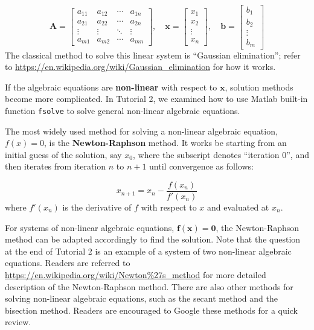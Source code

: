 \documentclass[a4paper,11pt]{article}
\newcommand{\bm}{\mathbf}
\theoremstyle{definition}
\begin{document}
\begin{equation}
	\bm A = \left[ 
		\begin{array}{cccc}
			a_{11} & a_{12} & \cdots & a_{1n} \\
			a_{21} & a_{22} & \cdots & a_{2n} \\
			\vdots  & \vdots   & \ddots & \vdots \\
			a_{m1} & a_{m2} & \cdots & a_{mn}
		\end{array} \right], \quad
	\bm x = \left[
		\begin{array}{c}
			x_1 \\
			x_2 \\
			\vdots \\
			x_n
		\end{array} \right], \quad
	\bm b = \left[
		\begin{array}{c}
			b_1 \\
			b_2 \\
			\vdots \\
			b_m
		\end{array} \right]
\end{equation}
\noindent The classical method to solve this linear system is ``Gaussian elimination'';
refer to \url{https://en.wikipedia.org/wiki/Gaussian_elimination} for how it works.

If the algebraic equations are \textbf{non-linear} with respect to $\bm x$, solution methods become more
complicated. In Tutorial 2, we examined how to use Matlab built-in function \texttt{fsolve} to solve general
non-linear algebraic equations. 

The most widely used method for solving a non-linear algebraic equation,
$f(x) = 0$, is the \textbf{Newton-Raphson} method. It works be starting from an initial guess of
the solution, say $x_0$, where the subscript denotes ``iteration 0'', and then iterates from
iteration $n$ to $n+1$ until convergence as follows:

\begin{equation}
	x_{n+1} = x_n - \frac{f(x_n)}{f'(x_n)}
\end{equation}
\noindent where $f'(x_n)$ is the derivative of $f$ with respect to $x$ and evaluated at $x_n$.

For systems of non-linear algebraic equations, $\bm f(\bm x)=\bm 0$, the Newton-Raphson method
can be adapted accordingly to find the solution. Note that the question at the end of Tutorial 2 is an example
of a system of two non-linear algebraic equations.
Readers are referred to \url{https://en.wikipedia.org/wiki/Newton\%27s_method} for
more detailed description of the Newton-Raphson method. There are also other methods
for solving non-linear algebraic equations, such as the secant method and the bisection
method. Readers are encouraged to Google these methods for a quick review.
\end{document}
